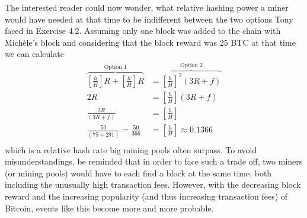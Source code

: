 \documentclass[12pt]{article}
\begin{document}
	The interested reader could now wonder, what relative hashing power a miner would have needed at that time to be indifferent between the two options Tony faced in Exercise 4.2. Assuming only one block was added to the chain with Michèle's block and considering that the block reward was 25 BTC at that time we can calculate
	\begin{align*}
		\overbrace{\left[\frac{h}{H}\right]R+\left[\frac{h}{H}\right]R}^{\text{Option 1}}&=\overbrace{\left[\frac{h}{H}\right]^2 (3R+f)}^{\text{Option 2}}\\
		2R&=\left[\frac{h}{H}\right] (3R+f)\\
		\frac{2R}{(3R+f)}&=\left[\frac{h}{H}\right]\\
		\frac{50}{(75+291)}=\frac{50}{366}&=\left[\frac{h}{H}\right] \approx 0.1366\\
	\end{align*}
	which is a relative hash rate big mining pools often surpass. To avoid misunderstandings, be reminded that in order to face such a trade off, two miners (or mining pools) would have to each find a block at the same time, both including the unusually high transaction fees. However, with the decreasing block reward and the increasing popularity (and thus increasing transaction fees) of Bitcoin, events like this become more and more probable.
\end{document}
